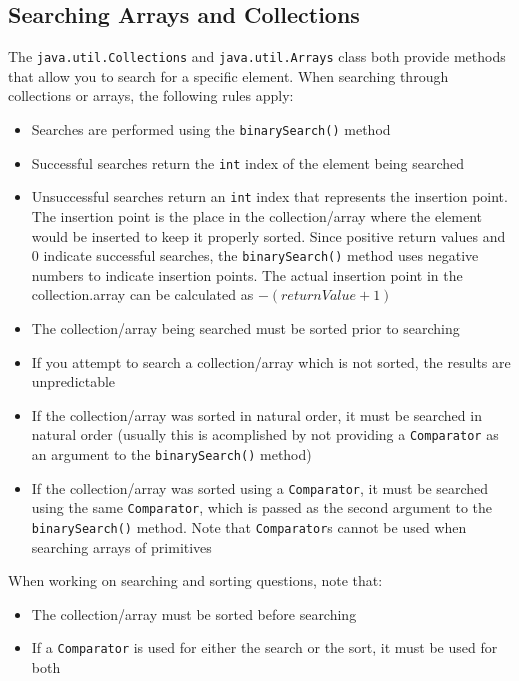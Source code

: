 \subsection{Searching Arrays and Collections}
The \verb#java.util.Collections# and \verb#java.util.Arrays# class both provide 
methods that allow you to search for a specific element. When searching through 
collections or arrays, the following rules apply:
\begin{itemize}
    \item Searches are performed using the \verb#binarySearch()# method
    \item Successful searches return the \verb#int# index of the element being 
    searched
    \item Unsuccessful searches return an \verb#int# index that represents the 
    insertion point. The insertion point is the place in the collection/array 
    where the element would be inserted to keep it properly sorted. Since 
    positive return values and 0 indicate successful searches, the 
    \verb#binarySearch()# method uses negative numbers to indicate insertion 
    points. The actual insertion point in the collection.array can be 
    calculated as $-(returnValue + 1)$
    \item The collection/array being searched must be sorted prior to searching
    \item If you attempt to search a collection/array which is not sorted, the 
    results are unpredictable
    \item If the collection/array was sorted in natural order, it must be 
    searched in natural order (usually this is acomplished by not providing a 
    \verb#Comparator# as an argument to the \verb#binarySearch()# method)
    \item If the collection/array was sorted using a \verb#Comparator#, it must 
    be searched using the same \verb#Comparator#, which is passed as the second 
    argument to the \verb#binarySearch()# method. Note that \verb#Comparator#s 
    cannot be used when searching arrays of primitives
\end{itemize}
When working on searching and sorting questions, note that:
\begin{itemize}
    \item The collection/array must be sorted before searching
    \item If a \verb#Comparator# is used for either the search or the sort, it 
    must be used for both
\end{itemize}

